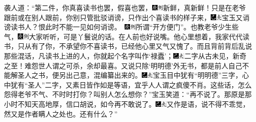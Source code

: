 袭人道：“第二件，你真喜读书也罢，假喜也罢，{\includegraphics[width=3mm]{../Images/00004}\includegraphics[width=3mm]{../Images/00011}\footnotesize \kaishu 新鲜，真新鲜！}只是在老爷跟前或在别人跟前，你别只管批驳诮谤，只作出个喜读书的样子来，{\includegraphics[width=3mm]{../Images/00003}\includegraphics[width=3mm]{../Images/00012}\footnotesize \kaishu 宝玉又诮谤读书人？恨此时不能一见如何诮谤。　{\includegraphics[width=3mm]{../Images/00004}\includegraphics[width=3mm]{../Images/00011}\footnotesize \kaishu 所谓“开方便门”。}}也教老爷少生些气，{\includegraphics[width=3mm]{../Images/00004}\includegraphics[width=3mm]{../Images/00011}\footnotesize \kaishu 大家听听，可是丫鬟说的话。}在人前也好说嘴。他心里想着，我家代代读书，只从有了你，不承望你不喜读书，已经他心里又气又愧了。而且背前背后乱说那些混话，凡读书上进的人，你就起个名字叫作‘禄蠹’；{\includegraphics[width=3mm]{../Images/00003}\includegraphics[width=3mm]{../Images/00012}\footnotesize \kaishu 二字从古未见，新奇之至！难怨世人谓之可杀，余却最喜。}又说只除‘明明德’外无书，都是前人自己不能解圣人之书，便另出己意，混编纂出来的。{\includegraphics[width=3mm]{../Images/00003}\includegraphics[width=3mm]{../Images/00012}\footnotesize \kaishu 宝玉目中犹有“明明德”三字，心中犹有“圣人”二字，又素日皆作如是等语，宜乎人人谓之疯傻不肖。}这些话，怎么怨得老爷不气、不时时打你？叫别人怎么想你？”宝玉笑道：“再不说了。那原是那小时不知天高地厚，信口胡说，如今再不敢说了。{\includegraphics[width=3mm]{../Images/00003}\includegraphics[width=3mm]{../Images/00012}\footnotesize \kaishu 又作是语，说不得不乖觉，然又是作者瞒人之处也。}还有什么？”

